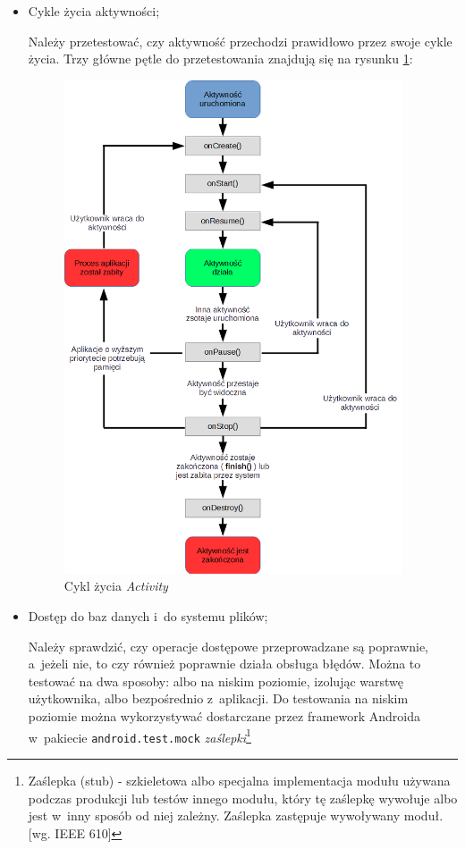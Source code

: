 \begin{itemize}
\item{Cykle życia aktywności;}

Należy przetestować, czy aktywność przechodzi prawidłowo przez swoje cykle życia. Trzy główne pętle do przetestowania znajdują się na rysunku \ref{fig:sample_figure}:
\begin{figure}[!htb]
    \centering
    \includegraphics[width=10cm]{imgs/ch2_activity_lifecycle.png}
    \caption{Cykl życia \textit{Activity} \cite{website:android:aktywnosci}}
    \label{fig:sample_figure}
\end{figure} 

\newpage
\item{Dostęp do baz danych i~do systemu plików;}

Należy sprawdzić, czy operacje dostępowe przeprowadzane są poprawnie, a~jeżeli nie, to czy również poprawnie działa obsługa błędów. Można to testować na dwa sposoby: albo na niskim poziomie, izolując warstwę użytkownika, albo bezpośrednio z~aplikacji. Do testowania na niskim poziomie można wykorzystywać dostarczane przez framework Androida w~pakiecie \texttt{android.test.mock} \textit{zaślepki}\footnote{Zaślepka (stub) - szkieletowa albo specjalna implementacja modułu używana podczas produkcji lub testów innego modułu, który tę zaślepkę wywołuje albo jest w~inny sposób od niej zależny. Zaślepka zastępuje wywoływany moduł. [wg. IEEE 610]}


\end{itemize}
